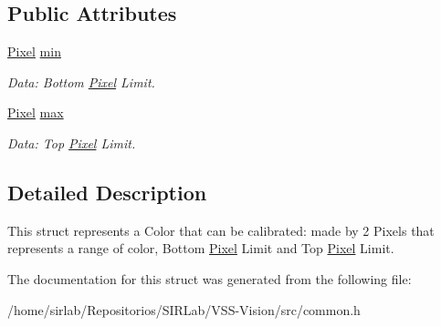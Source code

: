 \subsection*{Public Attributes}
\begin{DoxyCompactItemize}
\item 
\hypertarget{structcommon_1_1VisionColor_a3a8a40c24233df23f44510fce5846aaf}{\hyperlink{structcommon_1_1Pixel}{Pixel} \hyperlink{structcommon_1_1VisionColor_a3a8a40c24233df23f44510fce5846aaf}{min}}\label{structcommon_1_1VisionColor_a3a8a40c24233df23f44510fce5846aaf}

\begin{DoxyCompactList}\small\item\em Data\-: Bottom \hyperlink{structcommon_1_1Pixel}{Pixel} Limit. \end{DoxyCompactList}\item 
\hypertarget{structcommon_1_1VisionColor_adc2c9c3c09c9694f7ce8e9c8d94407bd}{\hyperlink{structcommon_1_1Pixel}{Pixel} \hyperlink{structcommon_1_1VisionColor_adc2c9c3c09c9694f7ce8e9c8d94407bd}{max}}\label{structcommon_1_1VisionColor_adc2c9c3c09c9694f7ce8e9c8d94407bd}

\begin{DoxyCompactList}\small\item\em Data\-: Top \hyperlink{structcommon_1_1Pixel}{Pixel} Limit. \end{DoxyCompactList}\end{DoxyCompactItemize}


\subsection{Detailed Description}
This struct represents a Color that can be calibrated\-: made by 2 Pixels that represents a range of color, Bottom \hyperlink{structcommon_1_1Pixel}{Pixel} Limit and Top \hyperlink{structcommon_1_1Pixel}{Pixel} Limit. 

The documentation for this struct was generated from the following file\-:\begin{DoxyCompactItemize}
\item 
/home/sirlab/\-Repositorios/\-S\-I\-R\-Lab/\-V\-S\-S-\/\-Vision/src/common.\-h\end{DoxyCompactItemize}

